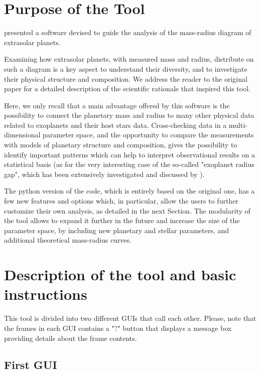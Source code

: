 \documentclass[preprint,12pt]{elsarticle}
\begin{document}
	\newpage
	\section{Purpose of the Tool}
	\textit{\cite{Zeng2021}} presented a software devised to guide the analysis of the mass-radius diagram of extrasolar planets. 

    Examining how extrasolar planets, with measured mass and radius, distribute on such a diagram is a key aspect to understand their diversity, and to investigate their physical structure and composition. 
    We address the reader to the original paper \textit{\cite{Zeng2021}} for a detailed description of the scientific rationale that inspired this tool. 
    
    Here, we only recall that a main advantage offered by this software is the possibility to connect the planetary mass and radius to many other physical data related to exoplanets and their host stars data. 
    Cross-checking data in a multi-dimensional parameter space, and the opportunity to compare the measurements with models of planetary structure and composition, gives the possibility to identify important patterns which can help to interpret observational results on a statistical basis (as for the very interesting case of the so-called "exoplanet radius gap", which has been extensively investigated and discussed by \textit{\cite{Zeng2021}}).
    
    The python version of the code, which is entirely based on the original one, has a few new features and options which, in particular, allow the users to further customize their own analysis, as detailed in the next Section. The modularity of the tool allows to expand it further in the future and increase the size of the parameter space, by including new planetary and stellar parameters, and additional theoretical mass-radius curves.
	
	\section{Description of the tool and basic instructions}
	This tool is divided into two different GUIs that call each other. 
    Please, note that the frames in each GUI contains a "?" button that displays a message box providing details about the frame contents.

        \subsection{First GUI}
        
\end{document}
